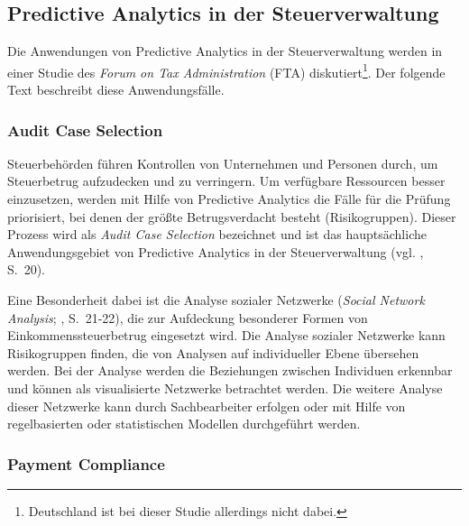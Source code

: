 



\subsection{Predictive Analytics in der Steuerverwaltung}

Die Anwendungen von Predictive Analytics in der Steuerverwaltung werden in einer
Studie des \emph{Forum on Tax Administration} (FTA) diskutiert\footnote{
Deutschland ist bei dieser Studie allerdings nicht dabei.
}. Der folgende Text beschreibt diese Anwendungsfälle.

\subsubsection{Audit Case Selection}

Steuerbehörden führen Kontrollen von Unternehmen und Personen durch, um Steuerbetrug
aufzudecken und zu verringern. Um verfügbare Ressourcen besser einzusetzen, werden mit Hilfe
von Predictive Analytics die Fälle für die Prüfung priorisiert, bei denen der größte Betrugsverdacht
besteht (Risikogruppen). Dieser Prozess wird als \emph{Audit Case Selection} bezeichnet und ist das hauptsächliche
Anwendungsgebiet von Predictive Analytics in der Steuerverwaltung (vgl. \cite{OECD}, S.~20).

Eine Besonderheit dabei ist die Analyse sozialer Netzwerke (\emph{Social Network Analysis}; \cite{OECD}, S.~21-22),
die zur Aufdeckung besonderer Formen von Einkommenssteuerbetrug eingesetzt wird. Die Analyse sozialer Netzwerke kann
Risikogruppen finden, die von Analysen auf individueller Ebene übersehen werden. Bei der Analyse werden die Beziehungen
zwischen Individuen erkennbar und können als visualisierte Netzwerke betrachtet werden. Die weitere Analyse dieser Netzwerke
kann durch Sachbearbeiter erfolgen oder mit Hilfe von regelbasierten oder statistischen Modellen durchgeführt werden.

\subsubsection{Payment Compliance}

